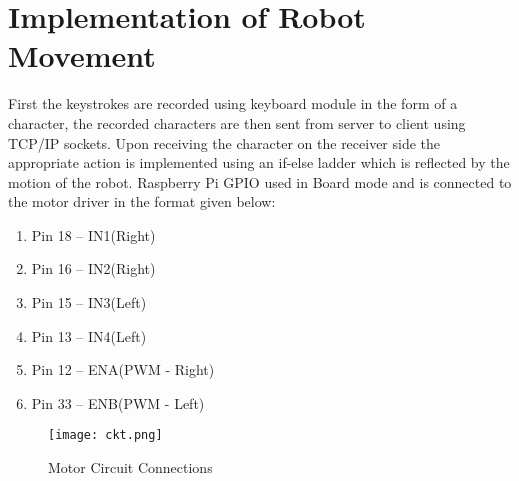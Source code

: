 \section{Implementation of Robot Movement}
First the keystrokes are recorded using keyboard module in the form of a character,
the recorded characters are then sent from server to client using TCP/IP sockets.
Upon receiving the character on the receiver side the appropriate action is
implemented using an if-else ladder which is reflected by the motion of the robot.
Raspberry Pi GPIO used in Board mode and is connected to the motor driver in the format given below:
\begin{enumerate}[ ]
\item Pin 18 – IN1(Right)
\item Pin 16 – IN2(Right)
\item Pin 15 – IN3(Left)
\item Pin 13 – IN4(Left)
\item Pin 12 – ENA(PWM - Right)
\item Pin 33 – ENB(PWM - Left)
\end{enumerate}
\begin{figure}[h]
\centering
\texttt{[image: ckt.png]}
\caption{Motor Circuit Connections}
\end{figure}